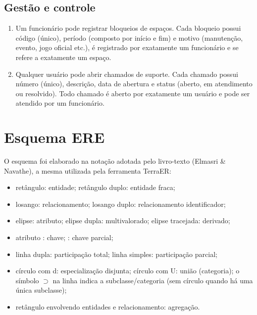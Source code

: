 \documentclass[11pt,a4paper]{article}
\begin{document}
\subsection{Gestão e controle}
\begin{enumerate}[resume*=req]
  \item Um funcionário pode registrar bloqueios de espaços. Cada
        bloqueio possui código (único), período (composto por início e fim) e
        motivo (manutenção, evento, jogo oficial etc.), é registrado por
        exatamente um funcionário e se refere a exatamente um espaço.
  \item Qualquer usuário pode abrir chamados de suporte. Cada chamado
        possui número (único), descrição, data de abertura e status
        (aberto, em atendimento ou resolvido). Todo chamado é aberto por
        exatamente um usuário e pode ser atendido por um funcionário.
\end{enumerate}

\section{Esquema ERE}\label{sec:ere}

O esquema foi elaborado na notação adotada pelo livro-texto (Elmasri \&
Navathe), a mesma utilizada pela ferramenta TerraER:

\begin{itemize}[nosep]
  \item retângulo: entidade; retângulo duplo: entidade fraca;
  \item losango: relacionamento; losango duplo: relacionamento identificador;
  \item elipse: atributo; elipse dupla: multivalorado; elipse tracejada: derivado;
  \item atributo : chave; : chave parcial;
  \item linha dupla: participação total; linha simples: participação parcial;
  \item círculo com d: especialização disjunta; círculo com
        U: união (categoria); o símbolo $\supset$ na linha indica a
        subclasse/categoria (sem círculo quando há uma única subclasse);
  \item retângulo envolvendo entidades e relacionamento: agregação.
\end{itemize}
\end{document}
